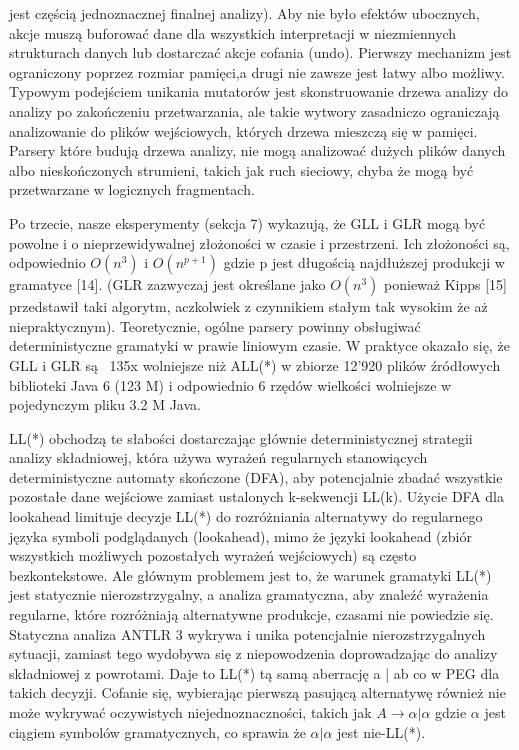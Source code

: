 jest częścią jednoznacznej finalnej analizy).
Aby nie było efektów ubocznych, akcje muszą buforować dane dla wszystkich interpretacji
w niezmiennych strukturach danych lub dostarczać akcje cofania (undo).
Pierwszy mechanizm jest ograniczony poprzez rozmiar pamięci,a drugi nie zawsze jest łatwy albo możliwy.
Typowym podejściem unikania mutatorów jest skonstruowanie drzewa analizy do analizy
po zakończeniu przetwarzania, ale takie wytwory zasadniczo ograniczają analizowanie
do plików wejściowych, których drzewa mieszczą się w pamięci.
Parsery które budują drzewa analizy, nie mogą analizować dużych plików danych albo
nieskończonych strumieni, takich jak ruch sieciowy, chyba że mogą być przetwarzane w logicznych fragmentach.
\par
Po trzecie, nasze eksperymenty (sekcja 7) wykazują, że GLL i GLR mogą być powolne i o nieprzewidywalnej
złożoności w czasie i przestrzeni.
Ich złożoności są, odpowiednio \(O(n^3)\) i \(O(n^{p+1})\) gdzie p jest długością
najdłuższej produkcji w gramatyce [14].
(GLR zazwyczaj jest określane jako \(O(n^3)\) ponieważ Kipps [15] przedstawił taki algorytm,
aczkolwiek z czynnikiem stałym tak wysokim że aż niepraktycznym).
Teoretycznie, ogólne parsery powinny obsługiwać deterministyczne gramatyki w prawie liniowym czasie.
W praktyce okazało się, że GLL i GLR są ~135x wolniejsze niż ALL(*)
w zbiorze 12'920 plików źródłowych biblioteki Java 6 (123 M)
i odpowiednio 6 rzędów wielkości wolniejsze w pojedynczym pliku 3.2 M Java.
\par
LL(*) obchodzą te słabości dostarczając głównie deterministycznej strategii analizy składniowej,
która używa wyrażeń regularnych stanowiących deterministyczne automaty skończone (DFA),
aby potencjalnie zbadać wszystkie pozostałe dane wejściowe zamiast ustalonych k-sekwencji LL(k).
Użycie DFA dla lookahead limituje decyzje LL(*) do rozróżniania alternatywy do regularnego
języka symboli podglądanych (lookahead),
mimo że języki lookahead (zbiór wszystkich możliwych pozostałych wyrażeń wejściowych)
są często bezkontekstowe. Ale głównym problemem jest to, że warunek gramatyki LL(*)
jest statycznie nierozstrzygalny, a analiza gramatyczna, aby znaleźć wyrażenia regularne,
które rozróżniają alternatywne produkcje, czasami nie powiedzie się.
Statyczna analiza ANTLR 3 wykrywa i unika potencjalnie nierozstrzygalnych sytuacji,
zamiast tego wydobywa się z niepowodzenia doprowadzając do analizy składniowej z powrotami.
Daje to LL(*) tą samą aberrację a | ab co w PEG dla takich decyzji.
Cofanie się, wybierając pierwszą pasującą alternatywę również nie może wykrywać
oczywistych niejednoznaczności, takich jak \(A \rightarrow \alpha | \alpha \) gdzie \(\alpha\)
jest ciągiem symbolów gramatycznych, co sprawia że \(\alpha | \alpha \) jest nie-LL(*).
